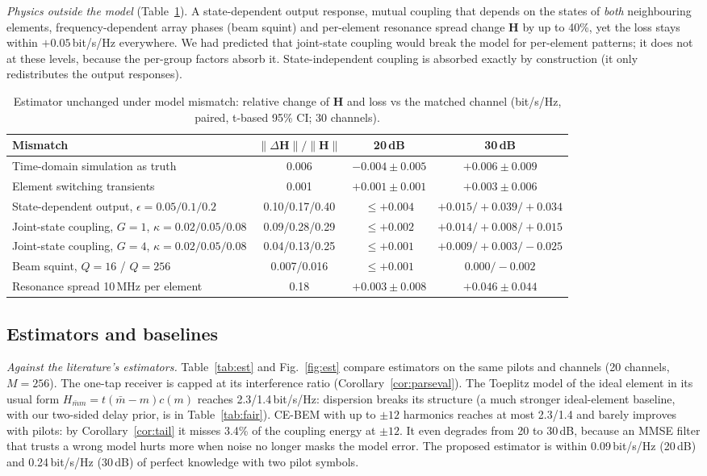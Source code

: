 \emph{Physics outside the model} (Table~\ref{tab:mismatch}). A state-dependent output response, mutual coupling that
depends on the states of \emph{both} neighbouring elements, frequency-dependent array phases (beam squint) and
per-element resonance spread change $\bm H$ by up to 40\%, yet the loss stays within $+0.05$\,bit/s/Hz everywhere. We had
predicted that joint-state coupling would break the model for per-element patterns; it does not at these levels,
because the per-group factors absorb it. State-independent coupling is absorbed exactly by construction (it only
redistributes the output responses).

\begin{table}[!htbp]\centering
\caption{Estimator unchanged under model mismatch: relative change of $\bm H$ and loss vs the matched channel (bit/s/Hz, paired, t-based 95\% CI; 30 channels).}\label{tab:mismatch}
\begin{tabular}{lccc}\toprule
Mismatch & $\|\Delta\bm H\|/\|\bm H\|$ & 20\,dB & 30\,dB \\\midrule
Time-domain simulation as truth & 0.006 & $-0.004\pm0.005$ & $+0.006\pm0.009$ \\
Element switching transients & 0.001 & $+0.001\pm0.001$ & $+0.003\pm0.006$ \\
State-dependent output, $\epsilon=0.05/0.1/0.2$ & 0.10/0.17/0.40 & $\le+0.004$ & $+0.015/+0.039/+0.034$ \\
Joint-state coupling, $G=1$, $\kappa=0.02/0.05/0.08$ & 0.09/0.28/0.29 & $\le+0.002$ & $+0.014/+0.008/+0.015$ \\
Joint-state coupling, $G=4$, $\kappa=0.02/0.05/0.08$ & 0.04/0.13/0.25 & $\le+0.001$ & $+0.009/+0.003/-0.025$ \\
Beam squint, $Q=16$ / $Q=256$ & 0.007/0.016 & $\le+0.001$ & $0.000/-0.002$ \\
Resonance spread 10\,MHz per element & 0.18 & $+0.003\pm0.008$ & $+0.046\pm0.044$ \\\bottomrule
\end{tabular}
\end{table}

\subsection{Estimators and baselines}\label{sec:res-est}
\emph{Against the literature's estimators.} Table~\ref{tab:est} and Fig.~\ref{fig:est} compare
estimators on the same pilots and channels (20 channels, $M=256$). The one-tap receiver is
capped at its interference ratio (Corollary~\ref{cor:parseval}). The Toeplitz model of the ideal
element in its usual form $H_{\bar mm}=t(\bar m-m)c(m)$ reaches 2.3/1.4\,bit/s/Hz: dispersion breaks its structure
(a much stronger ideal-element baseline, with our two-sided delay prior, is in Table~\ref{tab:fair}). CE-BEM with up to $\pm12$
harmonics reaches at most 2.3/1.4 and barely improves with pilots: by Corollary~\ref{cor:tail} it
misses 3.4\% of the coupling energy at $\pm12$. It even degrades from 20 to 30\,dB, because an
MMSE filter that trusts a wrong model hurts more when noise no longer masks the model error.
The proposed estimator is within 0.09\,bit/s/Hz (20\,dB) and 0.24\,bit/s/Hz (30\,dB) of perfect
knowledge with two pilot symbols.

